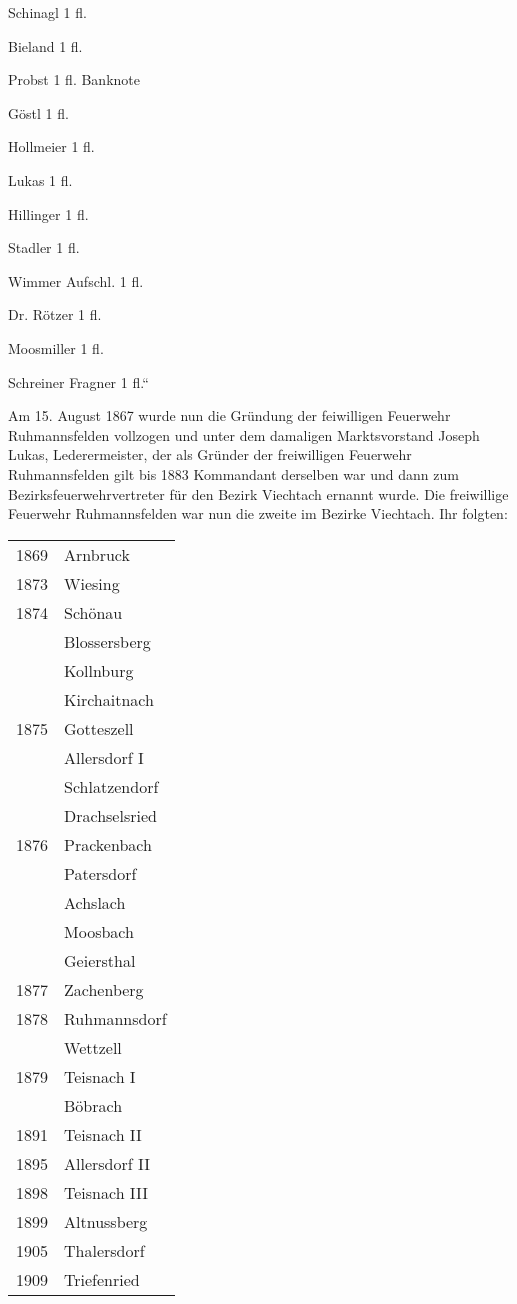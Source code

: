 \documentclass[12pt,a4paper]{book}
\begin{document}
\begin{compactitem}
\item Schinagl 1 fl.
\item Bieland 1 fl.
\item Probst 1 fl. Banknote
\item Göstl 1 fl.
\item Hollmeier 1 fl.
\item Lukas 1 fl.
\item Hillinger 1 fl.
\item Stadler 1 fl.
\item Wimmer Aufschl. 1 fl.
\item Dr. Rötzer 1 fl.
\item Moosmiller 1 fl.
\item Schreiner Fragner 1 fl.“
\end{compactitem}

Am 15. August 1867 wurde nun die Gründung der feiwilligen Feuerwehr
Ruhmannsfelden vollzogen und unter dem damaligen Marktsvorstand Joseph
Lukas, Lederermeister, der als Gründer der freiwilligen Feuerwehr
Ruhmannsfelden gilt bis 1883 Kommandant derselben war und dann zum
Bezirksfeuerwehrvertreter für den Bezirk Viechtach ernannt wurde. Die
freiwillige Feuerwehr Ruhmannsfelden war nun die zweite im Bezirke
Viechtach. Ihr folgten:

\begin{tabular}{ll}
1869 & Arnbruck\\
1873 & Wiesing\\
1874 & Schönau\\
& Blossersberg\\
& Kollnburg\\
& Kirchaitnach\\
1875 & Gotteszell\\
& Allersdorf I\\
& Schlatzendorf\\
& Drachselsried\\
1876 & Prackenbach\\
& Patersdorf\\
& Achslach\\
& Moosbach\\
& Geiersthal\\
1877 & Zachenberg\\
1878 & Ruhmannsdorf\\
& Wettzell\\
1879 & Teisnach I\\
& Böbrach\\
1891 & Teisnach II\\
1895 & Allersdorf II\\
1898 & Teisnach III\\
1899 & Altnussberg\\
1905 & Thalersdorf\\
1909 & Triefenried\\
\end{tabular}
\end{document}
